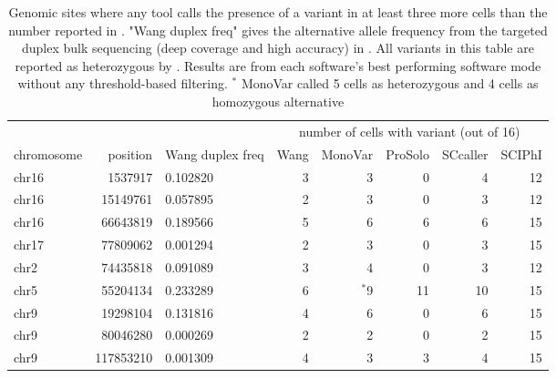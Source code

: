 \documentclass[authoryear,preprint,11pt]{scrartcl}
\begin{document}
\begin{table}
  \caption{
  Genomic sites where any tool calls the presence of a variant in at least three more cells than the number reported in \cite{wang_clonal_2014}.
  "Wang duplex freq" gives the alternative allele frequency from the targeted duplex bulk sequencing (deep coverage and high accuracy) in \cite{wang_clonal_2014}.
  All variants in this table are reported as heterozygous by \cite{wang_clonal_2014}.
  Results are from each software's best performing software mode without any threshold-based filtering.
  \footnotesize\newline$^*$ MonoVar called 5 cells as heterozygous and 4 cells as homozygous alternative}
  \begin{tabular}{p{9ex}rp{9ex}rrrrr}
    \toprule
    & & & \multicolumn{5}{c}{number of cells with variant (out of 16)} \\
    \cmidrule(l){4-8}
    chromosome & position & Wang duplex freq & Wang & MonoVar & ProSolo & SCcaller & SCIPhI \\
    \toprule
    chr16 &  1537917  & 0.102820 & 3 &     3 & 0 & 4 & 12\\
    \midrule
    chr16 & 15149761  & 0.057895 & 2 &     3 & 0 & 3 & 12\\
    \midrule
    chr16 & 66643819  & 0.189566 & 5 &     6 & 6 & 6 & 15\\
    \midrule
    chr17 & 77809062  & 0.001294 & 2 &     3 & 0 & 3 & 15\\
    \midrule
    chr2  & 74435818  & 0.091089 & 3 &     4 & 0 & 3 & 12\\
    \midrule
    chr5  & 55204134  & 0.233289 & 6 & $^*$9 & 11 & 10 & 15\\
    \midrule
    chr9  & 19298104  & 0.131816 & 4 &     6 & 0 & 6 & 15\\
    \midrule
    chr9  & 80046280  & 0.000269 & 2 &     2 & 0 & 2 & 15\\
    \midrule
    chr9  & 117853210 & 0.001309 & 4 &     3 & 3 & 4 & 15\\
    \bottomrule
  \end{tabular}
  \label{tab:sciphi-overimputed}
\end{table}
\end{document}
